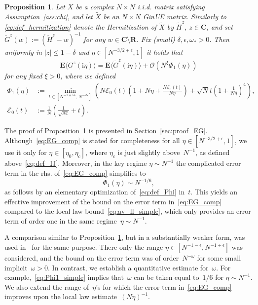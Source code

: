 \documentclass[10pt]{amsart}
\newtheorem{proposition}[theorem]{Proposition}
\numberwithin{equation}{section}
\newcommand{\E}{\mathbf{E}}
\newcommand{\R}{\mathbf{R}}
\newcommand{\C}{\mathbf{C}}
\newcommand{\ii}{\mathrm{i}}
\begin{document}
\begin{proposition}\label{prop:EG} Let $X$ be a complex $N\times N$ i.i.d. matrix satisfying Assumption~\ref{ass:chi}, and let $\widetilde{X}$ be an $N\times N$ GinUE matrix. Similarly to \eqref{eq:def_hermitization} denote the Hermitization of $\widetilde{X}$ by $\widetilde{H}^z$, $z\in \C$, and set $\widetilde{G}^z(w):=(\widetilde{H}^z-w)^{-1}$ for any $w\in \C\setminus\R$. Fix (small) $\delta,\epsilon, \omega_*>0$. Then uniformly in $|z|\le 1-\delta$ and $\eta\in [N^{-3/2+\epsilon},1]$ it holds that 
\begin{equation}
\E\langle G^z(\ii\eta)\rangle = \E \langle \widetilde{G}^z(\ii\eta)\rangle + \mathcal{O}(N^\xi\Phi_1(\eta))
\label{eq:EG_comp}
\end{equation}
for any fixed $\xi>0$, where we defined
\begin{equation}
\begin{split}
\Phi_1(\eta)&:=\min_{t\in [N^{-1+\omega_*},N^{-\omega_*}]}\left(N\mathcal{E}_0(t)\left(1+N\eta + \frac{N\mathcal{E}_0(t)}{N\eta}\right) +\sqrt{N}t\left(1+\frac{1}{N\eta}\right)^4\right),\\
\mathcal{E}_0(t)&:= \frac{1}{N}\left(\frac{1}{\sqrt{Nt}}+t\right).
\end{split}
\label{eq:def_Phi}
\end{equation}
\end{proposition}

The proof of Proposition~\ref{prop:EG} is presented in Section~\ref{sec:proof_EG}. Although~\eqref{eq:EG_comp} is stated for completeness for all $\eta\in [N^{-3/2+\epsilon},1]$, we use it only for $\eta\in [\eta_0,\eta_c]$, where $\eta_c$ is just slightly above~$N^{-1}$, as defined above~\eqref{eq:def_IJ}. Moreover, in the key regime $\eta\sim N^{-1}$ the complicated error term in the rhs. of~\eqref{eq:EG_comp} simplifies to
\begin{equation}
\Phi_1(\eta)\sim N^{-1/6},
\label{eq:Phi1_simple}
\end{equation}
as follows by an elementary optimization of~\eqref{eq:def_Phi} in~$t$. This yields an effective improvement of the bound on the error term in~\eqref{eq:EG_comp} compared to the local law bound~\eqref{eq:av_ll_simple}, which only provides an error term of order one in the same regime~$\eta\sim N^{-1}$.

A comparison similar to Proposition~\ref{prop:EG}, but in a substantially weaker form, was used in~\cite[Eq.(4.21)]{macroCLT_complex} for the same purpose. There only the range $\eta\in [N^{-1-\epsilon}, N^{-1+\epsilon}]$ was considered, and the bound on the error term was of order~$N^{-\omega}$ for some small implicit~$\omega>0$. In contrast, we establish a quantitative estimate for~$\omega$. For example,~\eqref{eq:Phi1_simple} implies that~$\omega$ can be taken equal to~$1/6$ for $\eta\sim N^{-1}$. We also extend the range of~$\eta$'s for which the error term in~\eqref{eq:EG_comp} improves upon the local law estimate~$(N\eta)^{-1}$.
\end{document}

